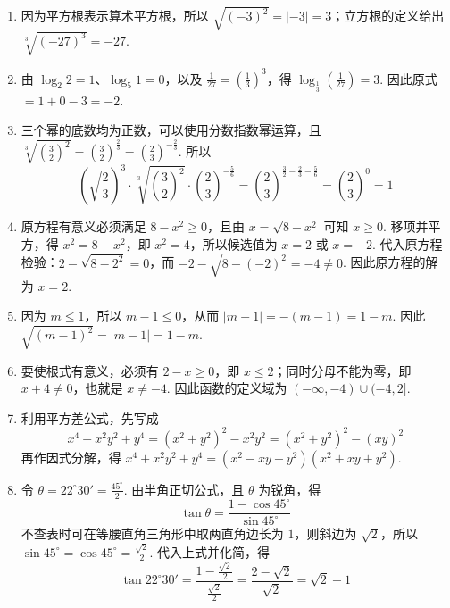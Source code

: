 \begin{solution}
\begin{enumerate}
\item 因为平方根表示算术平方根，所以 \(\sqrt{\left(-3\right)^2}=\left|-3\right|=3\)；立方根的定义给出 \(\sqrt[3]{\left(-27\right)^3}=-27\).

\item 由 \(\log_2 2=1\)、\(\log_5 1=0\)，以及 \(\frac{1}{27}=\left(\frac{1}{3}\right)^3\)，得 \(\log_{\frac{1}{3}}\left(\frac{1}{27}\right)=3\). 因此原式 \(=1+0-3=-2\).

\item 三个幂的底数均为正数，可以使用分数指数幂运算，且 \(\sqrt[3]{\left(\frac{3}{2}\right)^2}=\left(\frac{3}{2}\right)^{\frac{2}{3}}=\left(\frac{2}{3}\right)^{-\frac{2}{3}}\). 所以
\[
\left(\sqrt{\frac{2}{3}}\right)^3\cdot\sqrt[3]{\left(\frac{3}{2}\right)^2}\cdot\left(\frac{2}{3}\right)^{-\frac{5}{6}}=\left(\frac{2}{3}\right)^{\frac{3}{2}-\frac{2}{3}-\frac{5}{6}}=\left(\frac{2}{3}\right)^0=1
\]

\item 原方程有意义必须满足 \(8-x^2\geq 0\)，且由 \(x=\sqrt{8-x^2}\) 可知 \(x\geq 0\). 移项并平方，得 \(x^2=8-x^2\)，即 \(x^2=4\)，所以候选值为 \(x=2\) 或 \(x=-2\). 代入原方程检验：\(2-\sqrt{8-2^2}=0\)，而 \(-2-\sqrt{8-(-2)^2}=-4\neq 0\). 因此原方程的解为 \(x=2\).

\item 因为 \(m\leq 1\)，所以 \(m-1\leq 0\)，从而 \(\left|m-1\right|=-(m-1)=1-m\). 因此 \(\sqrt{\left(m-1\right)^2}=\left|m-1\right|=1-m\).

\item 要使根式有意义，必须有 \(2-x\geq 0\)，即 \(x\leq 2\)；同时分母不能为零，即 \(x+4\neq 0\)，也就是 \(x\neq -4\). 因此函数的定义域为 \((-\infty,-4)\cup(-4,2]\).

\item 利用平方差公式，先写成
\[
x^4+x^2y^2+y^4=\left(x^2+y^2\right)^2-x^2y^2=\left(x^2+y^2\right)^2-\left(xy\right)^2
\]
再作因式分解，得 \(x^4+x^2y^2+y^4=\left(x^2-xy+y^2\right)\left(x^2+xy+y^2\right)\).

\item 令 \(\theta=22^\circ30'=\frac{45^\circ}{2}\). 由半角正切公式，且 \(\theta\) 为锐角，得
\[
\tan\theta=\frac{1-\cos45^\circ}{\sin45^\circ}
\]
不查表时可在等腰直角三角形中取两直角边长为 \(1\)，则斜边为 \(\sqrt{2}\)，所以 \(\sin45^\circ=\cos45^\circ=\frac{\sqrt{2}}{2}\). 代入上式并化简，得
\[
\tan22^\circ30'=\frac{1-\frac{\sqrt{2}}{2}}{\frac{\sqrt{2}}{2}}=\frac{2-\sqrt{2}}{\sqrt{2}}=\sqrt{2}-1
\]
\end{enumerate}
\end{solution}

